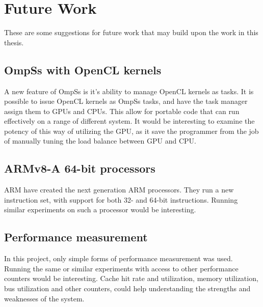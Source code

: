 \chapter[Future Work]{Future Work}
These are some suggestions for future work that may build upon the work in this thesis.

\section{OmpSs with OpenCL kernels}
A new feature of OmpSs is it's ability to manage OpenCL kernels as tasks.
It is possible to issue OpenCL kernels as OmpSs tasks, and have the task manager assign them to GPUs and CPUs.
This allow for portable code that can run effectively on a range of different system.
It would be interesting to examine the potency of this way of utilizing the GPU, as it save the programmer from the job of manually tuning the load balance between GPU and CPU.

\section{ARMv8-A 64-bit processors}
ARM have created the next generation ARM processors.
They run a new instruction set, with support for both 32- and 64-bit instructions.
Running similar experiments on such a processor would be interesting.

\section{Performance measurement}
In this project, only simple forms of performance measurement was used.
Running the same or similar experiments with access to other performance counters would be interesting.
Cache hit rate and utilization, memory utilization, bus utilization and other counters, could help understanding the strengths and weaknesses of the system.

